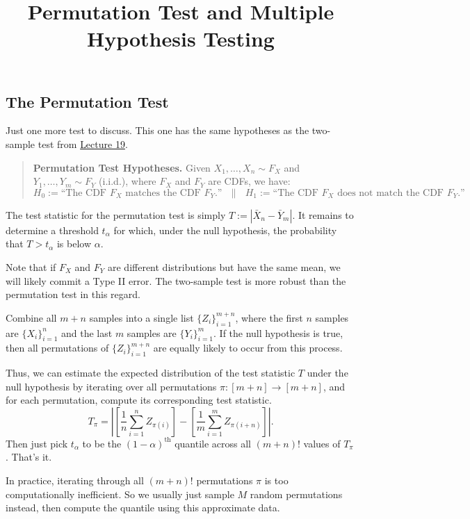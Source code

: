 \title{Permutation Test and Multiple Hypothesis Testing}



\subsection{The Permutation Test}

Just one more test to discuss.
This one has the same hypotheses as the two-sample test from
\href{/18.650/lectures/19/}{Lecture 19}.

\begin{quote}
    \textbf{Permutation Test Hypotheses.}
    Given $X_1, \dots, X_n \sim F_X$
    and $Y_1, \dots, Y_m \sim F_Y$ (i.i.d.),
    where $F_X$ and $F_Y$ are CDFs, we have:
    \[ H_0 := \text{``The CDF $F_X$ matches the CDF $F_Y$.''}
    ~~~ \parallel ~~~
    H_1 := \text{``The CDF $F_X$ does not match the CDF $F_Y$.''} \]
\end{quote}

The test statistic for the permutation test
is simply $T := |\bar{X}_n - \bar{Y}_m|$.
It remains to determine a threshold $t_{\alpha}$
for which, under the null hypothesis,
the probability that $T > t_{\alpha}$
is below $\alpha$.

\begin{remark}
    Note that if $F_X$ and $F_Y$ are different distributions
    but have the same mean,
    we will likely commit a Type II error.
    The two-sample test is more robust than the permutation test
    in this regard.
\end{remark}

Combine all $m + n$ samples into a single list
$\{Z_i\}_{i = 1}^{m + n}$,
where the first $n$ samples are $\{X_i\}_{i = 1}^n$
and the last $m$ samples are $\{Y_i\}_{i = 1}^m$.
If the null hypothesis is true,
then all permutations of $\{Z_i\}_{i = 1}^{m + n}$
are equally likely to occur from this process.

Thus, we can estimate the expected distribution of
the test statistic $T$ under the null hypothesis
by iterating over all permutations $\pi \colon [m + n] \to [m + n]$,
and for each permutation,
compute its corresponding test statistic.
\[ T_{\pi} = \left|
    \left[\frac{1}{n}\sum_{i = 1}^n Z_{\pi(i)}\right] -
    \left[\frac{1}{m}\sum_{i = 1}^m Z_{\pi(i + n)}\right]
\right|. \]
Then just pick $t_{\alpha}$ to be the $(1 - \alpha)^{\text{th}}$ quantile
across all $(m + n)!$ values of $T_{\pi}$.
That's it.

\begin{remark}
    In practice, iterating through all $(m + n)!$ permutations $\pi$
    is too computationally inefficient.
    So we usually just sample $M$ random permutations instead,
    then compute the quantile using this approximate data.
\end{remark}

